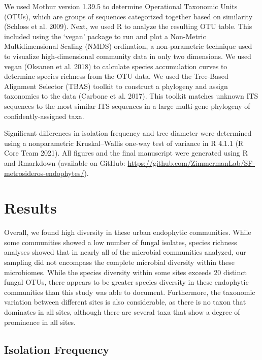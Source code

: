 \documentclass[fleqn,10pt,lineno]{wlpeerj} %
\begin{document}
We used Mothur version 1.39.5 to determine Operational Taxonomic Units (OTUs), which are groups of sequences categorized together based on similarity (Schloss et al. 2009). Next, we used R to analyze the resulting OTU table. This included using the `vegan' package to run and plot a Non-Metric Multidimensional Scaling (NMDS) ordination, a non-parametric technique used to visualize high-dimensional community data in only two dimensions. We used vegan (Oksanen et al. 2018) to calculate species accumulation curves to determine species richness from the OTU data. We used the Tree-Based Alignment Selector (TBAS) toolkit to construct a phylogeny and assign taxonomies to the data (Carbone et al. 2017). This toolkit matches unknown ITS sequences to the most similar ITS sequences in a large multi-gene phylogeny of confidently-assigned taxa.

Significant differences in isolation frequency and tree diameter were determined using a nonparametric Kruskal--Wallis one-way test of variance in R 4.1.1 (R Core Team 2021). All figures and the final manuscript were generated using R and Rmarkdown (available on GitHub: \url{https://github.com/ZimmermanLab/SF-metrosideros-endophytes/}).

\hypertarget{results}{%
\section*{Results}\label{results}}

Overall, we found high diversity in these urban endophytic communities. While some communities showed a low number of fungal isolates, species richness analyses showed that in nearly all of the microbial communities analyzed, our sampling did not encompass the complete microbial diversity within these microbiomes. While the species diversity within some sites exceeds 20 distinct fungal OTUs, there appears to be greater species diversity in these endophytic communities than this study was able to document. Furthermore, the taxonomic variation between different sites is also considerable, as there is no taxon that dominates in all sites, although there are several taxa that show a degree of prominence in all sites.

\hypertarget{isolation-frequency}{%
\subsection*{Isolation Frequency}\label{isolation-frequency}}
\end{document}
